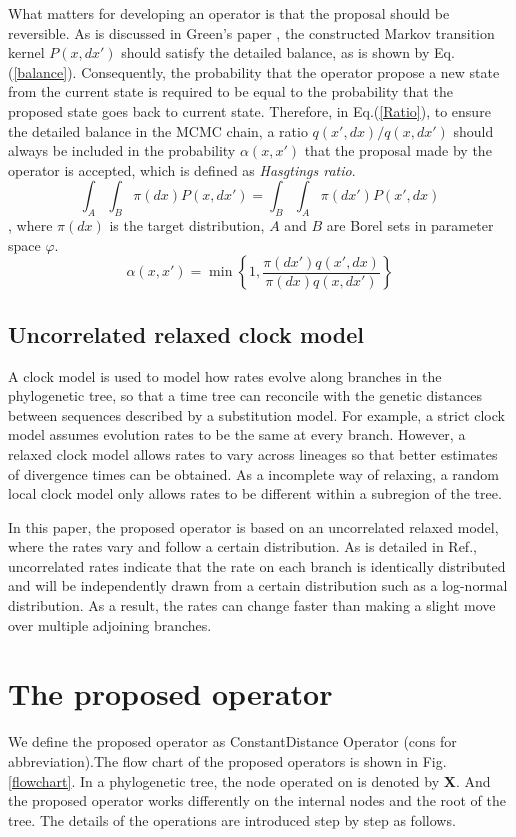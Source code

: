 \documentclass{bmcart}
\begin{document}
What matters for developing an operator is that the proposal should be reversible. As is discussed in Green's paper \cite{green1995reversible}, the constructed Markov transition kernel $P(x,dx')$ should satisfy the detailed balance, as is shown by Eq.(\ref{balance}). Consequently, the probability that the operator propose a new state from the current state is required to be equal to the probability that the proposed state goes back to current state. Therefore, in Eq.(\ref{Ratio}), to ensure the detailed balance in the MCMC chain, a ratio ${q(x',dx)}/{q(x,dx')}$ should always be included in the probability $\alpha(x,x')$ that the proposal made by the operator is accepted, which is defined as \textit{Hasgtings ratio}.
\begin{equation}\label{balance}
\int_A {\int_B {\pi (dx)P(x,dx')} }  = \int_B {\int_A {\pi (dx')P(x',dx)} }
\end{equation}
, where ${\pi (dx)}$ is the target distribution, $A$ and $B$ are Borel sets in parameter space $\varphi$.
\begin{equation}\label{Ratio}
{\alpha}(x,x') = \min \left\{ {1,\frac{{\pi (dx'){q}(x',dx)}}{{\pi (dx){q}(x,dx')}}} \right\}
\end{equation}
\subsection*{Uncorrelated relaxed clock model}
A clock model is used to model how rates evolve along branches in the phylogenetic tree, so that a time tree can reconcile with the genetic distances between sequences described by a substitution model. For example, a strict clock model assumes evolution rates to be the same at every branch. However, a relaxed clock model allows rates to vary across lineages so that better estimates of divergence times can be obtained. As a incomplete way of relaxing, a random local clock model only allows rates to be different within a subregion of the tree.

In this paper, the proposed operator is based on an uncorrelated relaxed model, where the rates vary and follow a certain distribution. As is detailed in Ref.\cite{drummond2006relaxed}, uncorrelated rates indicate that the rate on each branch is identically distributed and will be independently drawn from a certain distribution such as a log-normal distribution. As a result, the rates can change faster than making a slight move over multiple adjoining branches.
\section*{The proposed operator}
We define the proposed operator as ConstantDistance Operator (cons for abbreviation).The flow chart of the proposed operators is shown in Fig.\ref{flowchart}. In a phylogenetic tree, the node operated on is denoted by \textbf{X}. And the proposed operator works differently on the internal nodes and the root of the tree. The details of the operations are introduced step by step as follows.
\end{document}
